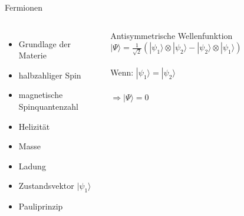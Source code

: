 \documentclass[aspectratio=169,xcolor=dvipsnames]{beamer}
\begin{document}
\begin{frame}{Fermionen}
    \begin{columns}[c]
        \begin{itemize}
            \item Grundlage der Materie
            \item halbzahliger Spin
            \item magnetische Spinquantenzahl
            \item Helizität
            \item Masse
            \item Ladung
            \item Zustandsvektor $|\psi_1\rangle$
            \item Pauliprinzip
        \end{itemize}
        \begin{exampleblock}{Antisymmetrische Wellenfunktion}
            $|\Psi\rangle = \frac{1}{\sqrt{2}} \left( |\psi_1\rangle \otimes |\psi_2\rangle - |\psi_2\rangle \otimes |\psi_1\rangle \right)$\\
            $ $\\
            Wenn: $|\psi_1\rangle = |\psi_2\rangle$\\
            $ $\\
            $\Rightarrow |\Psi\rangle = 0$
        \end{exampleblock}
    \end{columns}
\end{frame}
\end{document}
